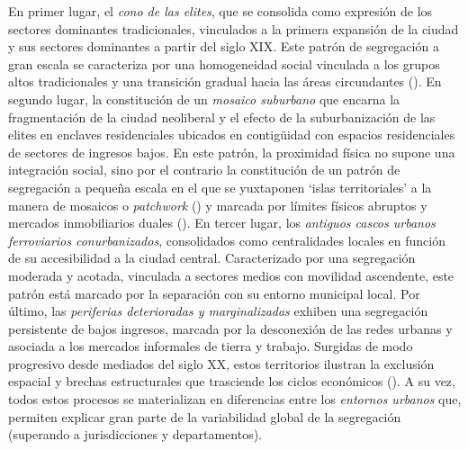 \documentclass[
  spanish,
  a4paper,%
  chapterprefix=true,%
  DIV=calc,%
  twoside]{scrbook}%
\begin{document}
En primer lugar, el \emph{cono de las elites}, que se consolida como
expresión de los sectores dominantes tradicionales, vinculados a la
primera expansión de la ciudad y sus sectores dominantes a partir del
siglo XIX. Este patrón de segregación a gran escala se caracteriza por
una homogeneidad social vinculada a los grupos altos tradicionales y una
transición gradual hacia las áreas circundantes (). En
segundo lugar, la constitución de un \emph{mosaico suburbano} que encarna la
fragmentación de la ciudad neoliberal y el efecto de la suburbanización
de las elites en enclaves residenciales ubicados en contigüidad con
espacios residenciales de sectores de ingresos bajos. En este patrón, la
proximidad física no supone una integración social, sino por el
contrario la constitución de un patrón de segregación a pequeña escala
en el que se yuxtaponen `islas territoriales' a la manera de mosaicos o
\emph{patchwork} () y marcada por límites físicos abruptos y
mercados inmobiliarios duales (). En tercer lugar, los
\emph{antiguos cascos urbanos ferroviarios conurbanizados}, consolidados como
centralidades locales en función de su accesibilidad a la ciudad
central. Caracterizado por una segregación moderada y acotada, vinculada
a sectores medios con movilidad ascendente, este patrón está marcado por
la separación con su entorno municipal local. Por último, las
\emph{periferias deterioradas y marginalizadas} exhiben una segregación
persistente de bajos ingresos, marcada por la desconexión de las redes
urbanas y asociada a los mercados informales de tierra y trabajo.
Surgidas de modo progresivo desde mediados del siglo XX, estos
territorios ilustran la exclusión espacial y brechas estructurales que
trasciende los ciclos económicos (). A su vez, todos
estos procesos se materializan en diferencias entre los \emph{entornos
urbanos} que, permiten explicar gran parte de la variabilidad global de
la segregación (superando a jurisdicciones y departamentos).
\end{document}
